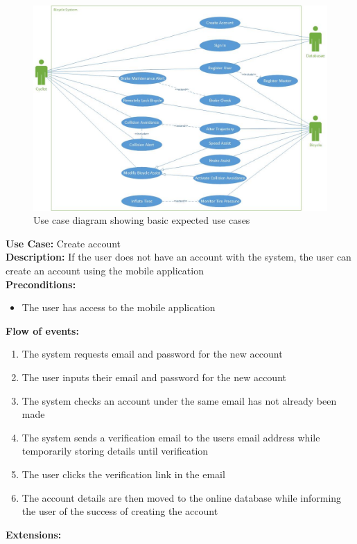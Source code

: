 \documentclass[a4paper]{report}
\begin{document}
\begin{figure}[h]
\centering
\includegraphics[scale=0.5]{figures/bicycle_system_use_case}
\caption{Use case diagram showing basic expected use cases}
\label{fig:ebicycle_system_use_case}
\end{figure}
\noindent\textbf{Use Case:} Create account \\
\textbf{Description:} If the user does not have an account with the system, the user can create an account using the mobile application \\
\textbf{Preconditions:} \begin{itemize}
\item The user has access to the mobile application
\end{itemize}
\textbf{Flow of events:} \begin{enumerate}
\item The system requests email and password for the new account
\item The user inputs their email and password for the new account
\item The system checks an account under the same email has not already been made
\item The system sends a verification email to the users email address while temporarily storing details until verification
\item The user clicks the verification link in the email
\item The account details are then moved to the online database while informing the user of the success of creating the account
\end{enumerate}
\textbf{Extensions:} \\\\
\end{document}
